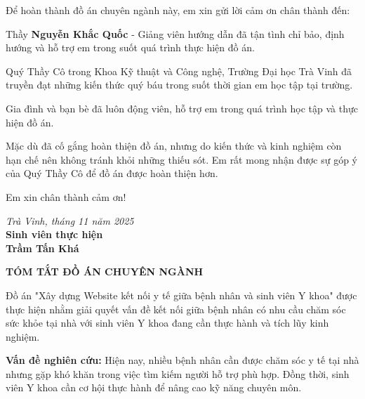 \documentclass[a4paper,13pt]{extreport}
\begin{document}
Để hoàn thành đồ án chuyên ngành này, em xin gửi lời cảm ơn chân thành đến:

Thầy \textbf{Nguyễn Khắc Quốc} - Giảng viên hướng dẫn đã tận tình chỉ bảo, định hướng và hỗ trợ em trong suốt quá trình thực hiện đồ án.

Quý Thầy Cô trong Khoa Kỹ thuật và Công nghệ, Trường Đại học Trà Vinh đã truyền đạt những kiến thức quý báu trong suốt thời gian em học tập tại trường.

Gia đình và bạn bè đã luôn động viên, hỗ trợ em trong quá trình học tập và thực hiện đồ án.

Mặc dù đã cố gắng hoàn thiện đồ án, nhưng do kiến thức và kinh nghiệm còn hạn chế nên không tránh khỏi những thiếu sót. Em rất mong nhận được sự góp ý của Quý Thầy Cô để đồ án được hoàn thiện hơn.

Em xin chân thành cảm ơn!

\begin{flushright}
\textit{Trà Vinh, tháng 11 năm 2025}\\
\textbf{Sinh viên thực hiện}\\[1cm]
\textbf{Trầm Tấn Khá}
\end{flushright}

\newpage
\tableofcontents

\newpage
\listoffigures
{}

\newpage
\listoftables
{}


\newpage
{}
\begin{center}
\textbf{\Large TÓM TẮT ĐỒ ÁN CHUYÊN NGÀNH}
\end{center}
\vspace{1cm}

Đồ án "Xây dựng Website kết nối y tế giữa bệnh nhân và sinh viên Y khoa" được thực hiện nhằm giải quyết vấn đề kết nối giữa bệnh nhân có nhu cầu chăm sóc sức khỏe tại nhà với sinh viên Y khoa đang cần thực hành và tích lũy kinh nghiệm.

\textbf{Vấn đề nghiên cứu:} Hiện nay, nhiều bệnh nhân cần được chăm sóc y tế tại nhà nhưng gặp khó khăn trong việc tìm kiếm người hỗ trợ phù hợp. Đồng thời, sinh viên Y khoa cần cơ hội thực hành để nâng cao kỹ năng chuyên môn.
\end{document}

